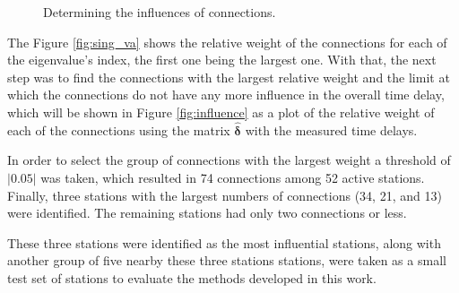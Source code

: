 \documentclass[12pt, sumlimits, intlimits]{article}
\begin{document}
\begin{figure}[ht] 
	\centering 
	\caption{Determining the influences of connections.}
	\label{fig:connectioninfluence}
\end{figure}

The Figure \ref{fig:sing_va} shows the relative weight of the connections for each of the eigenvalue's index, the first one being the largest one. With that, the next step was to find the connections with the largest relative weight and the limit at which the connections do not have any more influence in the overall time delay, which will be shown in Figure \ref{fig:influence} as a plot of the relative weight of each of the connections using the matrix $\bm{\hat{\delta}}$ with the measured time delays.

In order to select the group of connections with the largest weight a threshold of $|0.05|$ was taken, which resulted in 74 connections among 52 active stations. Finally, three stations with the largest numbers of connections (34, 21, and 13) were identified. The remaining stations had only two connections or less. 

These three stations were identified as the most influential stations, along with another group of five nearby these three stations stations, were taken as a small test set of stations to evaluate the methods developed in this work. 
\end{document}
